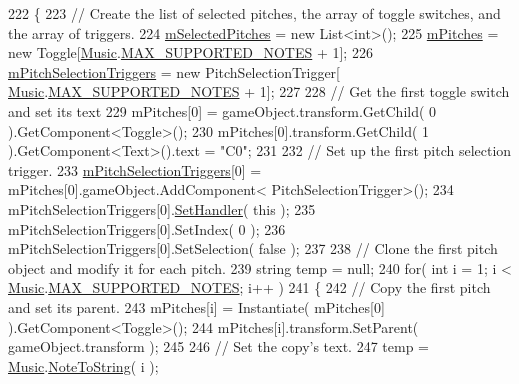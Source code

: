 \begin{DoxyCode}
222         \{
223             \textcolor{comment}{// Create the list of selected pitches, the array of toggle switches, and the array of
       triggers.}
224             \hyperlink{group___s_c_handlers_ga816236cbae1f13ea34be94fb1b86b7cd}{mSelectedPitches} = \textcolor{keyword}{new} List<int>();
225             \hyperlink{group___s_c_handlers_ga19dbd38f92df12e9b3d52b01634fdc53}{mPitches} = \textcolor{keyword}{new} Toggle[\hyperlink{class_music}{Music}.\hyperlink{group___music_constants_gaaf07da909a12e9fec0e43b70864f27b7}{MAX\_SUPPORTED\_NOTES} + 1];
226             \hyperlink{group___s_c_handlers_ga1affedf973b4aa39505b35053c12df7e}{mPitchSelectionTriggers} = \textcolor{keyword}{new} PitchSelectionTrigger[
      \hyperlink{class_music}{Music}.\hyperlink{group___music_constants_gaaf07da909a12e9fec0e43b70864f27b7}{MAX\_SUPPORTED\_NOTES} + 1];
227 
228             \textcolor{comment}{// Get the first toggle switch and set its text}
229             mPitches[0] = gameObject.transform.GetChild( 0 ).GetComponent<Toggle>();
230             mPitches[0].transform.GetChild( 1 ).GetComponent<Text>().text = \textcolor{stringliteral}{"C0"};
231 
232             \textcolor{comment}{// Set up the first pitch selection trigger.}
233             \hyperlink{group___s_c_handlers_ga1affedf973b4aa39505b35053c12df7e}{mPitchSelectionTriggers}[0] = mPitches[0].gameObject.AddComponent<
      PitchSelectionTrigger>();
234             mPitchSelectionTriggers[0].\hyperlink{group___s_c_handlers_ga963bc1a13bdd44643cf814aa4976f3d0}{SetHandler}( \textcolor{keyword}{this} );
235             mPitchSelectionTriggers[0].SetIndex( 0 );
236             mPitchSelectionTriggers[0].SetSelection( \textcolor{keyword}{false} );
237 
238             \textcolor{comment}{// Clone the first pitch object and modify it for each pitch.}
239             \textcolor{keywordtype}{string} temp = null;
240             \textcolor{keywordflow}{for}( \textcolor{keywordtype}{int} i = 1; i < \hyperlink{class_music}{Music}.\hyperlink{group___music_constants_gaaf07da909a12e9fec0e43b70864f27b7}{MAX\_SUPPORTED\_NOTES}; i++ )
241             \{
242                 \textcolor{comment}{// Copy the first pitch and set its parent.}
243                 mPitches[i] = Instantiate( mPitches[0] ).GetComponent<Toggle>();
244                 mPitches[i].transform.SetParent( gameObject.transform );
245 
246                 \textcolor{comment}{// Set the copy's text.}
247                 temp = \hyperlink{class_music}{Music}.\hyperlink{group___music_stat_func_ga85a22c905d56d4c5f4e62159bfecee8c}{NoteToString}( i );

\end{DoxyCode}
